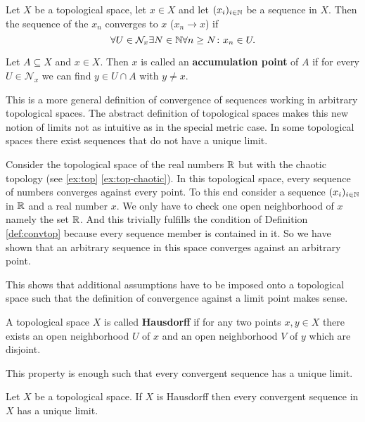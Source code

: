\begin{defin}\label{def:convtop}
  Let $X$ be a topological space, let $x \in X$ and let $(x_i)_{i \in \mathbb{N}}$ be a sequence in $X$. Then the sequence of the $x_n$ converges to $x$ ($x_n \to x$) if
  \begin{equation*}
    \forall U \in \mathcal{N}_x\exists N\in\mathbb{N}\forall n \geq N\colon x_n \in U.
  \end{equation*}

  Let $A \subseteq X$ and $x \in X$. Then $x$ is called an \textbf{accumulation point} of $A$ if for every $U \in \mathcal{N}_x$ we can find $y \in U \cap A$ with $y \neq x$.
\end{defin}
This is a more general definition of convergence of sequences working in arbitrary topological spaces. The abstract definition of topological spaces makes this new notion of limits not as intuitive as in the special metric case. In some topological spaces there exist sequences that do not have a unique limit.

\begin{ex}
  Consider the topological space of the real numbers $\mathbb{R}$ but with the chaotic topology (see \ref{ex:top} \ref{ex:top-chaotic}). In this topological space, every sequence of numbers converges against every point. To this end consider a sequence $(x_i)_{i\in\mathbb{N}}$ in $\mathbb{R}$ and a real number $x$. We only have to check one open neighborhood of $x$ namely the set $\mathbb{R}$. And this trivially fulfills the condition of Definition \ref{def:convtop} because every sequence member is contained in it. So we have shown that an arbitrary sequence in this space converges against an arbitrary point.  
\end{ex}

This shows that additional assumptions have to be imposed onto a topological space such that the definition of convergence against a limit point makes sense.

\begin{defin}
  A topological space $X$ is called \textbf{Hausdorff} if for any two points $x, y \in X$ there exists an open neighborhood $U$ of $x$ and an open neighborhood $V$ of $y$ which are disjoint.   
\end{defin}

This property is enough such that every convergent sequence has a unique limit.

\begin{thm}
  Let $X$ be a topological space. If $X$ is Hausdorff then every convergent sequence in $X$ has a unique limit.
\end{thm}


